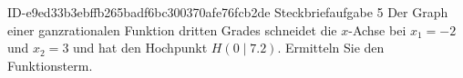 \begin{exercise}
      {ID-e9ed33b3ebffb265badf6bc300370afe76fcb2de}
      {Steckbriefaufgabe 5}
  \ifproblem\problem
    Der Graph einer ganzrationalen Funktion dritten Grades schneidet
    die $x$-Achse bei $x_1=\num{-2}$ und $x_2=\num{3}$ und hat den
    Hochpunkt $H(\num{0}\mid\num{7.2})$. Ermitteln Sie den
    Funktionsterm.
  \fi
\end{exercise}
